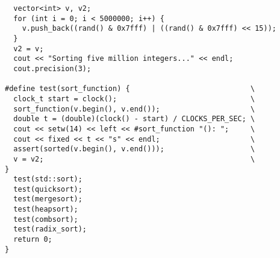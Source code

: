\begin{lstlisting}
  vector<int> v, v2;
  for (int i = 0; i < 5000000; i++) {
    v.push_back((rand() & 0x7fff) | ((rand() & 0x7fff) << 15));
  }
  v2 = v;
  cout << "Sorting five million integers..." << endl;
  cout.precision(3);

#define test(sort_function) {                            \
  clock_t start = clock();                               \
  sort_function(v.begin(), v.end());                     \
  double t = (double)(clock() - start) / CLOCKS_PER_SEC; \
  cout << setw(14) << left << #sort_function "(): ";     \
  cout << fixed << t << "s" << endl;                     \
  assert(sorted(v.begin(), v.end()));                    \
  v = v2;                                                \
}
  test(std::sort);
  test(quicksort);
  test(mergesort);
  test(heapsort);
  test(combsort);
  test(radix_sort);
  return 0;
}
\end{lstlisting}
